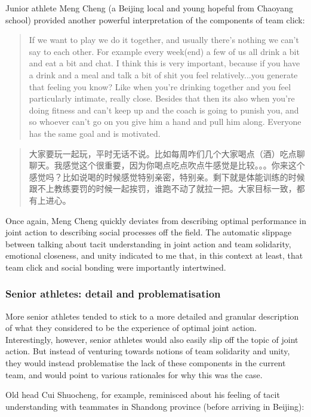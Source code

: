 \begin{CJK}{UTF8}{gbsn}
Junior athlete Meng Cheng (a Beijing local and young hopeful from Chaoyang school) provided another powerful interpretation of the components of team click:

      \begin{quote}
        If we want to play we do it together, and usually there’s nothing we can’t say to each other. For example every week(end) a few of us all drink a bit and eat a bit and chat.  I think this is very important, because if you have a drink and a meal and talk a bit of shit you feel relatively...you generate that feeling you know? Like when you’re drinking together and you feel particularly intimate, really close.  Besides that then its also when you’re doing fitness and can’t keep up and the coach is going to punish you, and so whoever can’t go on you give him a hand and pull him along.  Everyone has the same goal and is motivated.
      \end{quote}

      \begin{quote}
        大家要玩一起玩，平时无话不说。比如每周咋们几个大家喝点（酒）吃点聊聊天。我感觉这个很重要，因为你喝点吃点吹点牛感觉是比较。。。你来这个感觉吗？比如说喝的时候感觉特别亲密，特别亲。剩下就是体能训练的时候跟不上教练要罚的时候一起挨罚，谁跑不动了就拉一把。大家目标一致，都有上进心。 
      \end{quote}

Once again, Meng Cheng quickly deviates from describing optimal performance in joint action to describing social processes off the field.  The automatic slippage between talking about tacit understanding in joint action and team solidarity, emotional closeness, and unity indicated to me that, in this context at least, that team click and social bonding were importantly intertwined.


\subsubsection{Senior athletes: detail and problematisation}
More senior athletes tended to stick to a more detailed and granular description of what they considered to be the experience of optimal joint action. Interestingly, however, senior athletes would also easily slip off the topic of joint action.  But instead of venturing towards notions of team solidarity and unity, they would instead problematise the lack of these components in the current team, and would point to various rationales for why this was the case.

Old head Cui Shuocheng, for example, reminisced about his feeling of tacit understanding with teammates in Shandong province (before arriving in Beijing):


\end{CJK}

